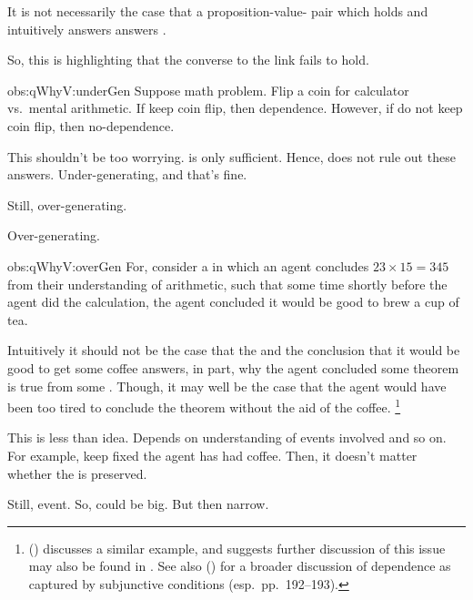 \begin{note}
  \begin{observation}
    \label{obs:qWhyV:underGen}
    It is not necessarily the case that a proposition-value-\pool{} pair which holds and intuitively answers \qWhy{} answers \qWhyV{}.
  \end{observation}

  So, this is highlighting that the converse to the link fails to hold.

  \begin{motivation}{obs:qWhyV:underGen}
    Suppose math problem.
    Flip a coin for calculator vs.\ mental arithmetic.
    If keep coin flip, then dependence.
    However, if do not keep coin flip, then no-dependence.
  \end{motivation}

  This shouldn't be too worrying.
  \qWhyV{} is only sufficient.
  Hence, does not rule out these answers.
  Under-generating, and that's fine.

  Still, over-generating.

  \begin{observation}
    \label{obs:qWhyV:overGen}
    Over-generating.
  \end{observation}

  \begin{motivation}{obs:qWhyV:overGen}
     For, consider a  in which an agent concludes \(23 \times 15 = 345\) from their understanding of arithmetic, such that some time shortly before the agent did the calculation, the agent concluded it would be good to brew a cup of tea.

    Intuitively it should not be the case that the \ros{} and the conclusion that it would be good to get some coffee answers, in part, why the agent concluded some theorem is true from some \pool{}.
  Though, it may well be the case that the agent would have been too tired to conclude the theorem without the aid of the coffee.%
  \footnote{
    \citeauthor{Armstrong:1968vh} (\citeyear[195--196]{Armstrong:1968vh}) discusses a similar example, and suggests further discussion of this issue may also be found in \textcite{Moore:1962up}.
    See also \citeauthor{Sanford:1989aa} (\citeyear{Sanford:1989aa}) for a broader discussion of dependence as captured by subjunctive conditions (esp.\ pp.\ 192--193).
  }
  \end{motivation}

  This is less than idea.
  Depends on understanding of events involved and so on.
  For example, keep fixed the agent has had coffee.
  Then, it doesn't matter whether the \ros{} is preserved.

  Still, event.
  So, could be big.
  But then narrow.
\end{note}

